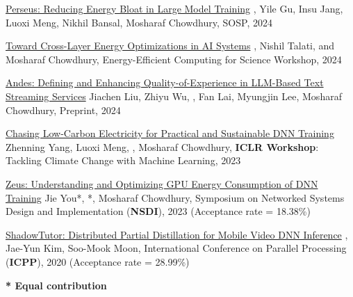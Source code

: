 

\begin{cvlist}

  \cvlistitem
    {\href{https://arxiv.org/abs/2312.06902}{Perseus: Reducing Energy Bloat in Large Model Training}} %
    {, Yile Gu, Insu Jang, Luoxi Meng, Nikhil Bansal, Mosharaf Chowdhury, SOSP, 2024} %

  \cvlistitem
    {\href{https://arxiv.org/abs/2404.06675}{Toward Cross-Layer Energy Optimizations in AI Systems}} %
    {, Nishil Talati, and Mosharaf Chowdhury, Energy-Efficient Computing for Science Workshop, 2024} %

  \cvlistitem
    {\href{https://arxiv.org/abs/2404.16283}{Andes: Defining and Enhancing Quality-of-Experience in LLM-Based Text Streaming Services}} %
    {Jiachen Liu, Zhiyu Wu, , Fan Lai, Myungjin Lee, Mosharaf Chowdhury, Preprint, 2024} %

  \cvlistitem
    {\href{https://jaewonchung.me/pdf.js/web/viewer.html?file=/assets/attachments/pubs/chase_iclrw23.pdf\#pagemode=none}{Chasing Low-Carbon Electricity for Practical and Sustainable DNN Training}} %
    {Zhenning Yang, Luoxi Meng, , Mosharaf Chowdhury, \textbf{ICLR Workshop}: Tackling Climate Change with Machine Learning, 2023} %

  \cvlistitem
    {\href{https://www.usenix.org/conference/nsdi23/presentation/you}{Zeus: Understanding and Optimizing GPU Energy Consumption of DNN Training}} %
    {Jie You*, *, Mosharaf Chowdhury, Symposium on Networked Systems Design and Implementation (\textbf{NSDI}), 2023 (Acceptance rate = 18.38\%)} %

  \cvlistitem
    {\href{https://jaewonchung.me/pdf.js/web/viewer.html?file=/assets/attachments/pubs/shadowtutor_icpp20.pdf\#pagemode=none}{ShadowTutor: Distributed Partial Distillation for Mobile Video DNN Inference}} %
    {, Jae-Yun Kim, Soo-Mook Moon, International Conference on Parallel Processing (\textbf{ICPP}), 2020 (Acceptance rate = 28.99\%)} %

\end{cvlist}

\vspace{-5mm}
\begin{cvparagraph}
  \textbf{* Equal contribution}
\end{cvparagraph}
